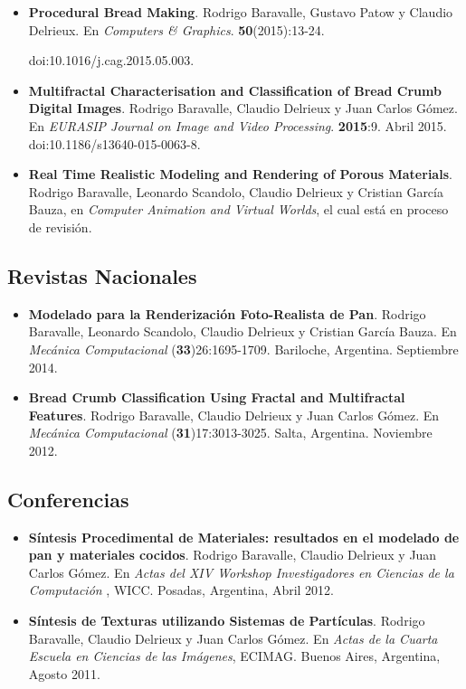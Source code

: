 \begin{itemize}
\item {\bf Procedural Bread Making}. Rodrigo Baravalle, Gustavo Patow y Claudio Delrieux. En {\it Computers \& Graphics}. {\bf 50}(2015):13-24.

doi:10.1016/j.cag.2015.05.003.

\item {\bf Multifractal Characterisation and Classification of Bread Crumb Digital Images}. Rodrigo Baravalle, Claudio Delrieux y Juan Carlos Gómez. En {\it EURASIP Journal on Image and Video Processing}. {\bf 2015}:9. Abril 2015. doi:10.1186/s13640-015-0063-8.

\item {\bf Real Time Realistic Modeling and Rendering of Porous Materials}. Rodrigo Baravalle, Leonardo Scandolo, Claudio Delrieux y Cristian García Bauza, en {\it Computer Animation and Virtual Worlds}, el cual está en proceso de revisión.
\end{itemize}


\subsection*{Revistas Nacionales}

\begin{itemize}
\item {\bf Modelado para la Renderización Foto-Realista de Pan}. Rodrigo Baravalle, Leonardo Scandolo, Claudio Delrieux y Cristian García Bauza. En {\it Mecánica Computacional} ({\bf 33})26:1695-1709. Bariloche, Argentina. Septiembre 2014.
\item {\bf Bread Crumb Classification Using Fractal and Multifractal Features}. Rodrigo Baravalle, Claudio Delrieux y Juan Carlos G\'omez. En {\it Mecánica Computacional} ({\bf 31})17:3013-3025. Salta, Argentina. Noviembre 2012.
\end{itemize}


\subsection*{Conferencias}
\begin{itemize}
\item {\bf Síntesis Procedimental de Materiales: resultados en el modelado de pan y materiales cocidos}. Rodrigo Baravalle, Claudio Delrieux y Juan Carlos G\'omez. En {\it Actas del XIV Workshop Investigadores en Ciencias de la Computación }, WICC. Posadas, Argentina, Abril 2012.
\item {\bf Síntesis de Texturas utilizando Sistemas de Partículas}. Rodrigo Baravalle, Claudio Delrieux y Juan Carlos G\'omez. En {\it Actas de la Cuarta Escuela en Ciencias de las Imágenes}, ECIMAG. Buenos Aires, Argentina, Agosto 2011.
\end{itemize}

